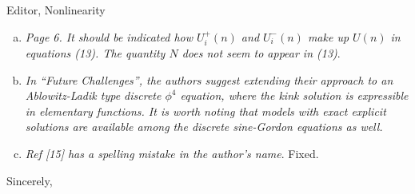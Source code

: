 \documentclass[11pt]{letter}
\begin{document}
\begin{letter}{Editor, Nonlinearity}
\begin{enumerate}[(a)]
\item \emph{Page 6. It should be indicated how $U_i^+(n)$ and $U_i^-(n)$ make up $U(n)$ in equations (13). The quantity $N$ does not seem to appear in (13)}.

\item \emph{In ``Future Challenges'', the authors suggest extending their approach to an Ablowitz-Ladik type discrete $\phi^4$ equation, where the kink solution is expressible in elementary functions. It is worth noting that models with exact explicit solutions are available among the discrete sine-Gordon equations as well.}

\item \emph{Ref [15] has a spelling mistake in the author’s name}. Fixed.

\end{enumerate}

\closing{Sincerely,}

\end{letter}
\end{document}
